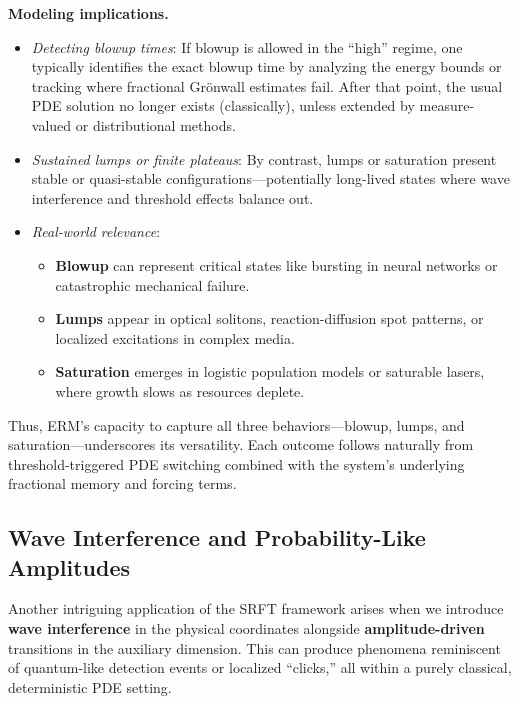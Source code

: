 \documentclass[12pt]{article}
\begin{document}
\noindent
\textbf{Modeling implications.}
\begin{itemize}
    \item \emph{Detecting blowup times}: 
    If blowup is allowed in the “high” regime, one typically identifies the
    exact blowup time by analyzing the energy bounds or tracking where
    fractional Grönwall estimates fail. After that point, the usual PDE
    solution no longer exists (classically), unless extended by measure-valued
    or distributional methods.
    \item \emph{Sustained lumps or finite plateaus}:
    By contrast, lumps or saturation present stable or quasi-stable 
    configurations—potentially long-lived states where wave interference 
    and threshold effects balance out. 
    \item \emph{Real-world relevance}:
    \begin{itemize}
        \item \textbf{Blowup} can represent critical states like bursting in
              neural networks or catastrophic mechanical failure.  
        \item \textbf{Lumps} appear in optical solitons, reaction-diffusion
              spot patterns, or localized excitations in complex media.  
        \item \textbf{Saturation} emerges in logistic population models or 
              saturable lasers, where growth slows as resources deplete.
    \end{itemize}
\end{itemize}

\noindent
Thus, ERM’s capacity to capture all three behaviors—blowup, lumps, and 
saturation—underscores its versatility. Each outcome follows naturally 
from threshold-triggered PDE switching combined with the system’s 
underlying fractional memory and forcing terms.
\subsection{Wave Interference and Probability-Like Amplitudes}
\label{subsec:wave_interference_amplitudes}

Another intriguing application of the SRFT framework arises when we introduce
\textbf{wave interference} in the physical coordinates alongside \textbf{amplitude-driven}
transitions in the auxiliary dimension. This can produce phenomena reminiscent of
quantum-like detection events or localized “clicks,” all within a purely classical,
deterministic PDE setting.
\end{document}
